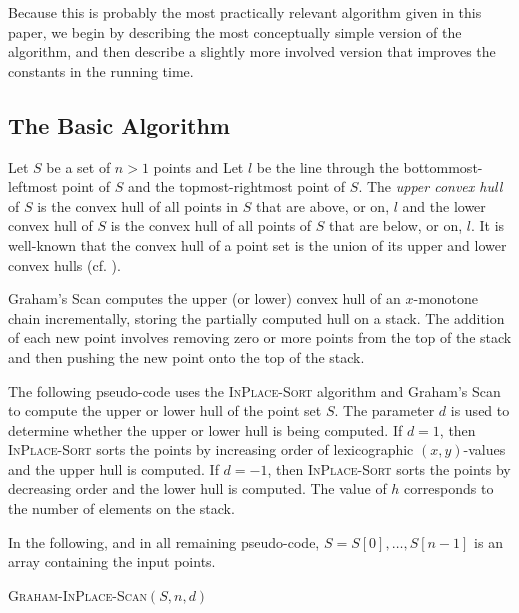 \documentclass{elsart}
\newcommand{\rt}{\mathrm{right\_turn}}
\begin{document}
Because this is probably the most practically relevant algorithm given
in this paper, we begin by describing the most conceptually simple
version of the algorithm, and then describe a slightly more involved
version that improves the constants in the running time.

\subsection{The Basic Algorithm}

Let $S$ be a set of $n>1$ points and Let $l$ be the line through the
bottommost-leftmost point of $S$ and the topmost-rightmost point of
$S$.  The \emph{upper convex hull} of $S$ is the convex hull of all
points in $S$ that are above, or on, $l$ and the lower convex hull of
$S$ is the convex hull of all points of $S$ that are below, or on,
$l$.  It is well-known that the convex hull of a point set is the
union of its upper and lower convex hulls (cf. \cite{ps85}).

Graham's Scan computes the upper (or lower) convex hull of an
$x$-monotone chain incrementally, storing the partially computed hull
on a stack.  The addition of each new point involves removing zero or
more points from the top of the stack and then pushing the new point
onto the top of the stack.

The following pseudo-code uses the \textsc{InPlace-Sort} algorithm and
Graham's Scan to compute the upper or lower hull of the point set $S$.
The parameter $d$ is used to determine whether the upper or lower hull
is being computed.  If $d=1$, then \textsc{InPlace-Sort} sorts the points
by increasing order of lexicographic $(x,y)$-values and the upper hull
is computed.  If $d=-1$, then \textsc{InPlace-Sort} sorts the points by
decreasing order and the lower hull is computed.  The value of $h$
corresponds to the number of elements on the stack.

In the following, and in all remaining pseudo-code,
$S=S[0],\ldots,S[n-1]$ is an array containing the input points.

\vspace{1ex}
\noindent\begin{minipage}{\textwidth}
\textsc{Graham-InPlace-Scan}$(S, n, d)$
\begin{algorithmic}[1]
  \WHILE{$h\ge 2$ \textbf{and} \textbf{not} $\rt(S[h-2], S[h-1], S[i])$}
  \ENDWHILE
\ENDFOR
{}
\end{algorithmic}
\end{minipage}
\vspace{1ex}
\end{document}
